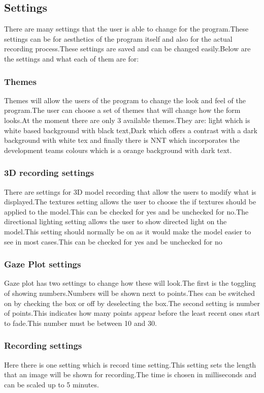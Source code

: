 \subsection{Settings}
There are many settings that the user is able to change for the program.These settings can be for aesthetics of the program itself and also for the actual recording process.These settings are saved and can be changed easily.Below are the settings and what each of them are for:
\subsubsection{Themes}
Themes will allow the users of the program to change the look and feel of the program.The user can choose a set of themes that will change how the form looks.At the moment there are only 3 available themes.They are: light which is white based background with black  text,Dark which offers a contrast with a dark background with white tex and finally there is NNT which incorporates the development teams colours which is a orange background with dark text. 
\subsubsection{3D recording settings}
There are settings for 3D model recording that allow the users to modify what is displayed.The textures setting allows the user to choose the if textures should be applied to the model.This can be checked for yes and be unchecked for no.The directional lighting setting allows the user to show directed light on the model.This setting should normally be on as it would make the model easier to see in most cases.This can be checked for yes and be unchecked for no
\subsubsection{Gaze Plot settings}
Gaze plot has two settings to change how these will look.The first is the toggling of showing numbers.Numbers will be shown next to points.Thes can be switched on by checking the box or off by deselecting the box.The second setting is number of points.This indicates how many points appear before the least recent ones start to fade.This number must be between 10 and 30.
\subsubsection{Recording settings}
Here there is one setting which is record time setting.This setting sets the length that an image will be shown for recording.The time is chosen in milliseconds and can be scaled up to 5 minutes.
\fi